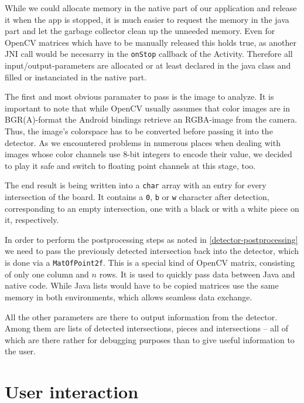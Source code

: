 	While we could allocate memory in the native part of our application and release it when the app is stopped, it is much easier to request the memory in the java part and let the garbage collector clean up the unneeded memory. Even for OpenCV matrices which have to be manually released this holds true, as another JNI call would be necesarry in the \texttt{onStop} callback of the Activity. Therefore all input/output-parameters are allocated or at least declared in the java class and filled or instanciated in the native part.

	The first and most obvious paramater to pass is the image to analyze. It is important to note that while OpenCV usually assumes that color images are in BGR(A)-format the Android bindings retrieve an RGBA-image from the camera. Thus, the image's colorspace has to be converted before passing it into the detector. As we encountered problems in numerous places when dealing with images whose color channels use 8-bit integers to encode their value, we decided to play it safe and switch to floating point channels at this stage, too.

	The end result is being written into a \texttt{char} array with an entry for every intersection of the board. It contains a \texttt{0}, \texttt{b} or \texttt{w} character after detection, corresponding to an empty intersection, one with a black or with a white piece on it, respectively.

	In order to perform the postprocessing steps as noted in \ref{detector-postprocessing} we need to pass the previously detected intersection back into the detector, which is done via a \texttt{MatOfPoint2f}. This is a special kind of OpenCV matrix, consisting of only one column and $n$ rows. It is used to quickly pass data between Java and native code. While Java lists would have to be copied matrices use the same memory in both environments, which allows seamless data exchange.

	All the other parameters are there to output information from the detector. Among them are lists of detected intersections, pieces and intersections -- all of which are there rather for debugging purposes than to give useful information to the user.

	\section{User interaction}
	\label{android-ui}
